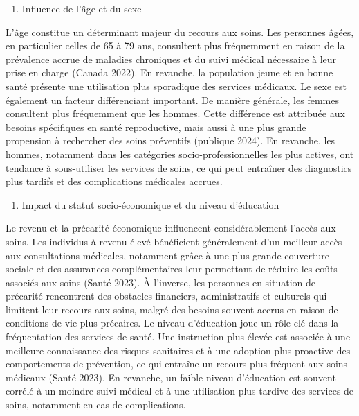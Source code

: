 \documentclass[
]{article}
\providecommand{\tightlist}{%
  \setlength{\itemsep}{0pt}\setlength{\parskip}{0pt}}
\begin{document}
\begin{enumerate}
\def\labelenumi{\arabic{enumi}.}
\tightlist
\item
  Influence de l'âge et du sexe
\end{enumerate}

L'âge constitue un déterminant majeur du recours aux soins. Les
personnes âgées, en particulier celles de 65 à 79 ans, consultent plus
fréquemment en raison de la prévalence accrue de maladies chroniques et
du suivi médical nécessaire à leur prise en charge (Canada 2022). En
revanche, la population jeune et en bonne santé présente une utilisation
plus sporadique des services médicaux. Le sexe est également un facteur
différenciant important. De manière générale, les femmes consultent plus
fréquemment que les hommes. Cette différence est attribuée aux besoins
spécifiques en santé reproductive, mais aussi à une plus grande
propension à rechercher des soins préventifs (publique 2024). En
revanche, les hommes, notamment dans les catégories
socio-professionnelles les plus actives, ont tendance à sous-utiliser
les services de soins, ce qui peut entraîner des diagnostics plus
tardifs et des complications médicales accrues.

\begin{enumerate}
\def\labelenumi{\arabic{enumi}.}
\setcounter{enumi}{1}
\tightlist
\item
  Impact du statut socio-économique et du niveau d'éducation
\end{enumerate}

Le revenu et la précarité économique influencent considérablement
l'accès aux soins. Les individus à revenu élevé bénéficient généralement
d'un meilleur accès aux consultations médicales, notamment grâce à une
plus grande couverture sociale et des assurances complémentaires leur
permettant de réduire les coûts associés aux soins (Santé 2023). À
l'inverse, les personnes en situation de précarité rencontrent des
obstacles financiers, administratifs et culturels qui limitent leur
recours aux soins, malgré des besoins souvent accrus en raison de
conditions de vie plus précaires. Le niveau d'éducation joue un rôle clé
dans la fréquentation des services de santé. Une instruction plus élevée
est associée à une meilleure connaissance des risques sanitaires et à
une adoption plus proactive des comportements de prévention, ce qui
entraîne un recours plus fréquent aux soins médicaux (Santé 2023). En
revanche, un faible niveau d'éducation est souvent corrélé à un moindre
suivi médical et à une utilisation plus tardive des services de soins,
notamment en cas de complications.
\end{document}
